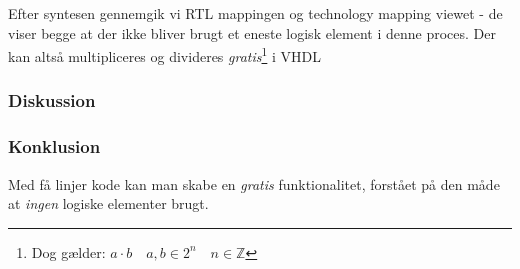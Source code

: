 
Efter syntesen gennemgik vi RTL mappingen og technology mapping viewet - de viser begge at der ikke bliver brugt et eneste logisk element i denne proces. Der kan altså multipliceres og divideres \emph{gratis}\footnote{Dog gælder: $a\cdot b \quad a,b \in 2^n \quad n \in \mathbb{Z}$} i VHDL



\subsubsection{Diskussion}

\subsubsection{Konklusion}

Med få linjer kode kan man skabe en \emph{gratis} funktionalitet, forstået på den måde at \textit{ingen} logiske elementer brugt.

